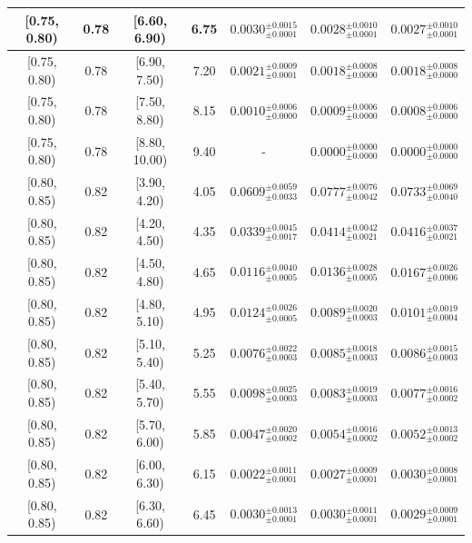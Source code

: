\begin{longtable}{|c|c|c|c|c|c|c|}
\hline
[0.75, 0.80) & 0.78 & [6.60, 6.90) & 6.75 & $0.0030^{ \pm 0.0015 }_{ \pm 0.0001 }$ & $0.0028^{ \pm 0.0010 }_{ \pm 0.0001 }$ & $0.0027^{ \pm 0.0010 }_{ \pm 0.0001 }$ \\ 
\hline
[0.75, 0.80) & 0.78 & [6.90, 7.50) & 7.20 & $0.0021^{ \pm 0.0009 }_{ \pm 0.0001 }$ & $0.0018^{ \pm 0.0008 }_{ \pm 0.0000 }$ & $0.0018^{ \pm 0.0008 }_{ \pm 0.0000 }$ \\ 
\hline
[0.75, 0.80) & 0.78 & [7.50, 8.80) & 8.15 & $0.0010^{ \pm 0.0006 }_{ \pm 0.0000 }$ & $0.0009^{ \pm 0.0006 }_{ \pm 0.0000 }$ & $0.0008^{ \pm 0.0006 }_{ \pm 0.0000 }$ \\ 
\hline
[0.75, 0.80) & 0.78 & [8.80, 10.00) & 9.40 & - & $0.0000^{ \pm 0.0000 }_{ \pm 0.0000 }$ & $0.0000^{ \pm 0.0000 }_{ \pm 0.0000 }$ \\ 
\hline
[0.80, 0.85) & 0.82 & [3.90, 4.20) & 4.05 & $0.0609^{ \pm 0.0059 }_{ \pm 0.0033 }$ & $0.0777^{ \pm 0.0076 }_{ \pm 0.0042 }$ & $0.0733^{ \pm 0.0069 }_{ \pm 0.0040 }$ \\ 
\hline
[0.80, 0.85) & 0.82 & [4.20, 4.50) & 4.35 & $0.0339^{ \pm 0.0045 }_{ \pm 0.0017 }$ & $0.0414^{ \pm 0.0042 }_{ \pm 0.0021 }$ & $0.0416^{ \pm 0.0037 }_{ \pm 0.0021 }$ \\ 
\hline
[0.80, 0.85) & 0.82 & [4.50, 4.80) & 4.65 & $0.0116^{ \pm 0.0040 }_{ \pm 0.0005 }$ & $0.0136^{ \pm 0.0028 }_{ \pm 0.0005 }$ & $0.0167^{ \pm 0.0026 }_{ \pm 0.0006 }$ \\ 
\hline
[0.80, 0.85) & 0.82 & [4.80, 5.10) & 4.95 & $0.0124^{ \pm 0.0026 }_{ \pm 0.0005 }$ & $0.0089^{ \pm 0.0020 }_{ \pm 0.0003 }$ & $0.0101^{ \pm 0.0019 }_{ \pm 0.0004 }$ \\ 
\hline
[0.80, 0.85) & 0.82 & [5.10, 5.40) & 5.25 & $0.0076^{ \pm 0.0022 }_{ \pm 0.0003 }$ & $0.0085^{ \pm 0.0018 }_{ \pm 0.0003 }$ & $0.0086^{ \pm 0.0015 }_{ \pm 0.0003 }$ \\ 
\hline
[0.80, 0.85) & 0.82 & [5.40, 5.70) & 5.55 & $0.0098^{ \pm 0.0025 }_{ \pm 0.0003 }$ & $0.0083^{ \pm 0.0019 }_{ \pm 0.0003 }$ & $0.0077^{ \pm 0.0016 }_{ \pm 0.0002 }$ \\ 
\hline
[0.80, 0.85) & 0.82 & [5.70, 6.00) & 5.85 & $0.0047^{ \pm 0.0020 }_{ \pm 0.0002 }$ & $0.0054^{ \pm 0.0016 }_{ \pm 0.0002 }$ & $0.0052^{ \pm 0.0013 }_{ \pm 0.0002 }$ \\ 
\hline
[0.80, 0.85) & 0.82 & [6.00, 6.30) & 6.15 & $0.0022^{ \pm 0.0011 }_{ \pm 0.0001 }$ & $0.0027^{ \pm 0.0009 }_{ \pm 0.0001 }$ & $0.0030^{ \pm 0.0008 }_{ \pm 0.0001 }$ \\ 
\hline
[0.80, 0.85) & 0.82 & [6.30, 6.60) & 6.45 & $0.0030^{ \pm 0.0013 }_{ \pm 0.0001 }$ & $0.0030^{ \pm 0.0011 }_{ \pm 0.0001 }$ & $0.0029^{ \pm 0.0009 }_{ \pm 0.0001 }$ \\ 

\end{longtable}
